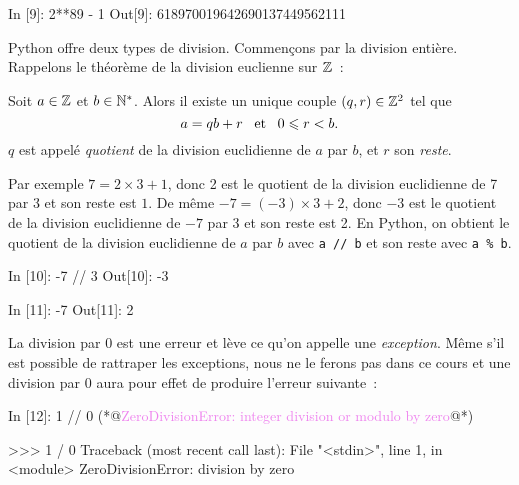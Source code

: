 \documentclass{magnolia}
\begin{document}
\begin{pythoncode}
In [9]: 2**89 - 1
Out[9]: 618970019642690137449562111
\end{pythoncode}
\vspace{1ex}

Python offre deux types de division. Commençons par la division entière. Rappelons le théorème de la division euclienne sur $\mathbb{Z}$~:

\begin{proposition}
Soit $a\in\mathbb{Z}$ et $b\in{\mathbb{N}^*}$. Alors il existe un unique couple $\left(q,r\right)\in\mathbb{Z}^2$
tel que
\[a=qb+r \quad\!\text{et}\quad\! 0\leqslant r<b.\]
$q$ est appelé \emph{quotient} de la division euclidienne de $a$ par $b$, et $r$ son
\emph{reste}.
\end{proposition}

\noindent
Par exemple $7 = 2\times 3 + 1$, donc 2 est le quotient de la division
euclidienne de 7 par 3 et son reste est $1$. De même $-7 = (-3)\times 3 + 2$, donc $-3$ est
le quotient de la division euclidienne de $-7$ par 3 et son reste est 2. En Python,
on obtient le quotient de la division euclidienne de $a$ par $b$ avec
\verb_a // b_ et son reste avec \verb_a % b_.

\begin{pythoncode}
In [10]: -7 // 3
Out[10]: -3

In [11]: -7 %
Out[11]: 2
\end{pythoncode}

\noindent La division par 0 est une erreur et lève ce
qu'on appelle une \emph{exception}. Même s'il est possible de rattraper les exceptions,
nous ne le ferons pas dans ce cours et une division par 0 aura pour effet de produire
l'erreur suivante~:

\begin{francois}
\begin{pythoncode}
In [12]: 1 // 0
(*@\textcolor{violet}{ZeroDivisionError: integer division or modulo by zero}@*)
\end{pythoncode}
\end{francois}
\begin{victor}
\begin{pythoncode}
>>> 1 / 0
Traceback (most recent call last):
  File "<stdin>", line 1, in <module>
ZeroDivisionError: division by zero
\end{pythoncode}
\end{victor}

\vspace{1ex}
\end{document}

